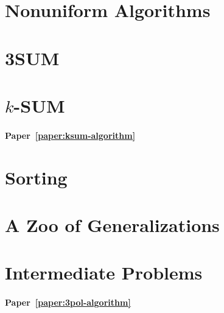 \section*{Nonuniform Algorithms}


\section*{3SUM}


\section*{\(k\)-SUM}

\paragraph{Paper~\ref{paper:ksum-algorithm}}


\section*{Sorting}


\section*{A Zoo of Generalizations}





\section*{Intermediate Problems}

\paragraph{Paper~\ref{paper:3pol-algorithm}}


